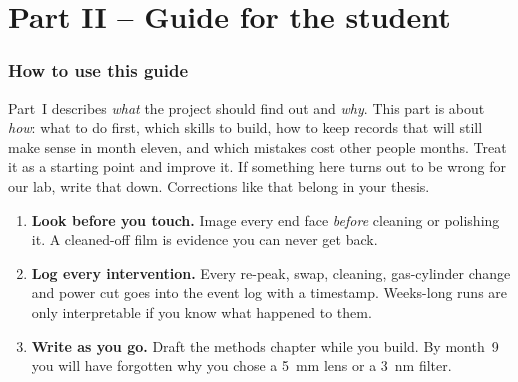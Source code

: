 \part*{Part II -- Guide for the student}
\section{How to use this guide}\label{sec:guide}
Part~I describes \emph{what} the project should find out and \emph{why}. This part is about
\emph{how}: what to do first, which skills to build, how to keep records that will still make sense
in month eleven, and which mistakes cost other people months. Treat it as a starting point and
improve it. If something here turns out to be wrong for our lab, write that down. Corrections like
that belong in your thesis.

\begin{keybox}
\begin{enumerate}[leftmargin=1.2em]
  \item \textbf{Look before you touch.} Image every end face \emph{before} cleaning or polishing it. A
        cleaned-off film is evidence you can never get back.
  \item \textbf{Log every intervention.} Every re-peak, swap, cleaning, gas-cylinder change and
        power cut goes into the event log with a timestamp. Weeks-long runs are only interpretable
        if you know what happened to them.
  \item \textbf{Write as you go.} Draft the methods chapter while you build. By month~9 you will
        have forgotten why you chose a \SI{5}{mm} lens or a \SI{3}{nm} filter.
\end{enumerate}
\end{keybox}

